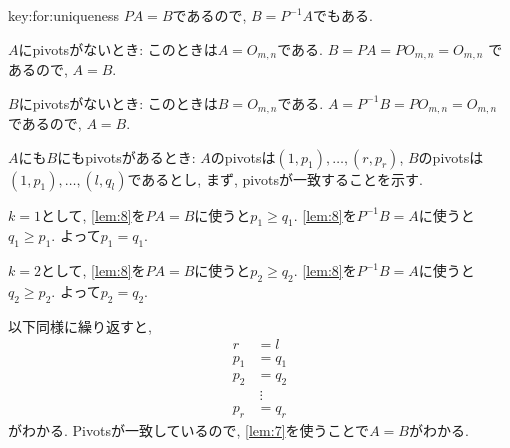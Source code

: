 \begin{proofof}{key:for:uniqueness}
  $PA=B$であるので, $B=P^{-1}A$でもある.
  
  $A$にpivotsがないとき:
  このときは$A=O_{m,n}$である.
  $B=PA=PO_{m,n}=O_{m,n}$
  であるので, $A=B$.

  $B$にpivotsがないとき:
  このときは$B=O_{m,n}$である.
  $A=P^{-1}B=PO_{m,n}=O_{m,n}$
  であるので, $A=B$.

  $A$にも$B$にもpivotsがあるとき:
  $A$のpivotsは$(1,p_1),\ldots,(r,p_r)$,
  $B$のpivotsは$(1,p_1),\ldots,(l,q_l)$であるとし,
  まず, pivotsが一致することを示す.
  
  $k=1$として,
  \cref{lem:8}を$PA=B$に使うと$p_1\geq q_1$.
  \cref{lem:8}を$P^{-1}B=A$に使うと$q_1\geq p_1$.
  よって$p_1=q_1$.

  $k=2$として,
  \cref{lem:8}を$PA=B$に使うと$p_2\geq q_2$.
  \cref{lem:8}を$P^{-1}B=A$に使うと$q_2\geq p_2$.
  よって$p_2=q_2$.

  以下同様に繰り返すと,
  \begin{align*}
    r&=l\\
    p_1&=q_1\\
    p_2&=q_2\\
    &\ \vdots\\
    p_r&=q_r
  \end{align*}
  がわかる.
  Pivotsが一致しているので,
  \cref{lem:7}を使うことで$A=B$がわかる.
\end{proofof}

